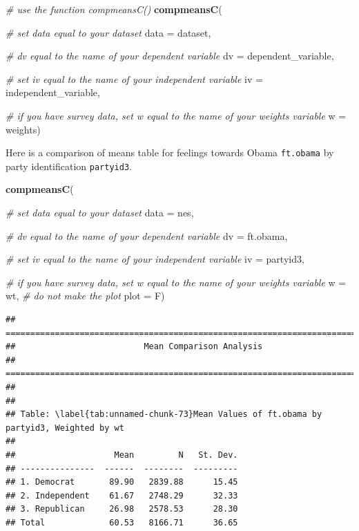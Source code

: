 \documentclass[
]{book}
\newenvironment{Shaded}{\begin{snugshade}}{\end{snugshade}}
\newcommand{\AttributeTok}[1]{\textcolor[rgb]{0.13,0.29,0.53}{#1}}
\newcommand{\CommentTok}[1]{\textcolor[rgb]{0.56,0.35,0.01}{\textit{#1}}}
\newcommand{\FunctionTok}[1]{\textcolor[rgb]{0.13,0.29,0.53}{\textbf{#1}}}
\newcommand{\NormalTok}[1]{#1}
\begin{document}
\begin{Shaded}
\begin{Highlighting}[]
\CommentTok{\# use the function \textasciigrave{}compmeansC()}
\FunctionTok{compmeansC}\NormalTok{(}
  
  \CommentTok{\# set \textasciigrave{}data\textasciigrave{} equal to your dataset}
  \AttributeTok{data =}\NormalTok{ dataset,}
  
  \CommentTok{\# \textasciigrave{}dv\textasciigrave{} equal to the name of your dependent variable}
  \AttributeTok{dv =}\NormalTok{ dependent\_variable, }
  
  \CommentTok{\# set \textasciigrave{}iv\textasciigrave{} equal to the name of your independent variable}
  \AttributeTok{iv =}\NormalTok{ independent\_variable, }
  
  \CommentTok{\# if you have survey data, set \textasciigrave{}w\textasciigrave{} equal to the name of your weights variable}
  \AttributeTok{w =}\NormalTok{ weights)}
\end{Highlighting}
\end{Shaded}

Here is a comparison of means table for feelings towards Obama \texttt{ft.obama} by party identification \texttt{partyid3}.

\begin{Shaded}
\begin{Highlighting}[]
\FunctionTok{compmeansC}\NormalTok{(}
  
  \CommentTok{\# set \textasciigrave{}data\textasciigrave{} equal to your dataset}
  \AttributeTok{data =}\NormalTok{ nes,}
  
  \CommentTok{\# \textasciigrave{}dv\textasciigrave{} equal to the name of your dependent variable}
  \AttributeTok{dv =}\NormalTok{ ft.obama, }
  
  \CommentTok{\# set \textasciigrave{}iv\textasciigrave{} equal to the name of your independent variable}
  \AttributeTok{iv =}\NormalTok{ partyid3, }
  
  \CommentTok{\# if you have survey data, set \textasciigrave{}w\textasciigrave{} equal to the name of your weights variable}
  \AttributeTok{w =}\NormalTok{ wt,}
  \CommentTok{\# do not make the plot}
  \AttributeTok{plot =}\NormalTok{ F)}
\end{Highlighting}
\end{Shaded}

\begin{verbatim}
## ===========================================================================
##                          Mean Comparison Analysis
## ===========================================================================
## 
## 
## Table: \label{tab:unnamed-chunk-73}Mean Values of ft.obama by partyid3, Weighted by wt
## 
##                    Mean         N   St. Dev.
## ---------------  ------  --------  ---------
## 1. Democrat       89.90   2839.88      15.45
## 2. Independent    61.67   2748.29      32.33
## 3. Republican     26.98   2578.53      28.30
## Total             60.53   8166.71      36.65
\end{verbatim}
\end{document}
